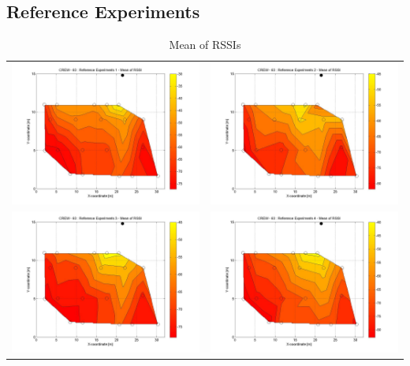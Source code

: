 \documentclass[11pt,a4paper,headinclude,footinclude,chapterprefix=on]{scrreprt}
\begin{document}
\subsection{Reference Experiments}
\begin{table}
	[h] \centering \caption{Mean of RSSIs} 
	\label{tb:63:Ref:mean} 
	\begin{tabular}
		{|l|l|} \hline 
		\includegraphics[width=8cm]{../../Source/plot/CREW_63/63_Ref_Ex_1_Mean.jpg} & 		\includegraphics[width=8cm]{../../Source/plot/CREW_63/63_Ref_Ex_2_Mean.jpg} \\
		\includegraphics[width=8cm]{../../Source/plot/CREW_63/63_Ref_Ex_3_Mean.jpg} & 		\includegraphics[width=8cm]{../../Source/plot/CREW_63/63_Ref_Ex_4_Mean.jpg} \\
		\hline
	\end{tabular}
\end{table}
\end{document}
